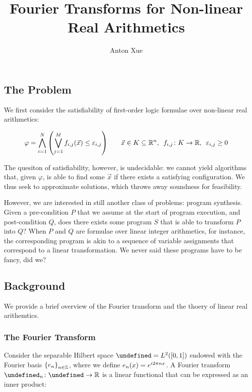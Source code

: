 \documentclass[12pt]{article}
\title{Fourier Transforms for Non-linear Real Arithmetics}
\author{Anton Xue}
\date{}
\let\H\undefined
\newcommand{\H}{\mathcal{H}}
\let\F\undefined
\newcommand{\F}{\mathcal{F}}
\begin{document}
\maketitle

\subsection{The Problem}
We first consider the satisfiability of first-order logic formulae over
non-linear real arithmetics:

\begin{align*}
  \varphi
    = \bigwedge_{i = 1}^{N} {\left(\bigvee_{j = 1}^{M}
        f_{i, j}{\left(\vec{x}\right)} \leq \varepsilon_{i, j}\right)}
  \qquad
  \vec{x} \in K \subseteq {\mathbb{R}}^n, \enskip
  {f_{i, j} \colon K \to {\mathbb{R}}}, \enskip
  \varepsilon_{i, j} \geq 0
\end{align*}

The quesiton of satisfiability, however, is undecidable:
we cannot yield algorithms that, given $\varphi$, is able to find some
$\vec{x}$ if there exists a satisfying configuration.
We thus seek to approximate solutions, which throws away soundness for
feasibility.

However, we are interested in still another class of problems:
program synthesis.
Given a pre-condition $P$ that we assume at the start of program execution,
and post-condition $Q$, does there exists some program $S$ that is able to
transform $P$ into $Q$?
When $P$ and $Q$ are formulae over linear integer arithmetics, for instance,
the corresponding program is akin to a sequence of variable assignments
that correspond to a linear transformation.
We never said these programs have to be fancy, did we?


\subsection{Background}
We provide a brief overview of the Fourier transform and the thoery of linear
real arithemtics.

\subsubsection{The Fourier Transform}
Consider the separable Hilbert space $\H = L^2 \parens{\brackets{0, 1}}$
endowed with the Fourier basis ${\left\{e_n\right\}}_{n \in {\mathbb{Z}}}$, where we define
$e_n {\left(x\right)} = e^{i 2\pi n x}$.
A Fourier transform $\type{\F_n}{\H}{\R}$ is a linear functional that can
be expressed as an inner product:
\end{document}
